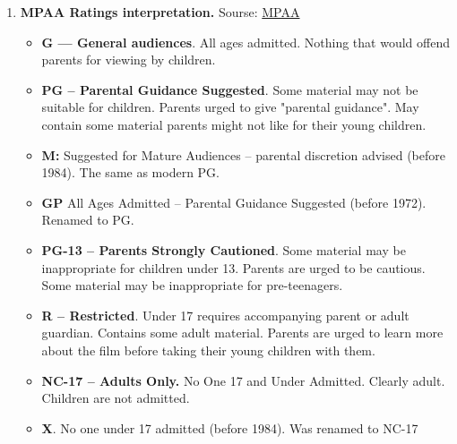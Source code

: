 \documentclass[a4paper,14pt]{article}
\begin{document}
\begin{enumerate}
\item \textbf{MPAA Ratings interpretation. }\label{MPAA}
Sourse: \href{https://en.wikipedia.org/wiki/Motion_Picture_Association_of_America_film_rating_system#From_M_to_GP_to_PG}{MPAA}
\begin{itemize}
\item \textbf{G — General audiences}. All ages admitted. Nothing that would offend parents for viewing by children.
\item \textbf{PG – Parental Guidance Suggested}. Some material may not be suitable for children. Parents urged to give "parental guidance". May contain some material parents might not like for their young children.
\item \textbf{M:} Suggested for Mature Audiences – parental discretion advised (before 1984). The same as modern PG. 
\item \textbf{GP} All Ages Admitted – Parental Guidance Suggested (before 1972). Renamed to PG.
\item \textbf{PG-13 – Parents Strongly Cautioned}. Some material may be inappropriate for children under 13. Parents are urged to be cautious. Some material may be inappropriate for pre-teenagers.
\item \textbf{R – Restricted}. Under 17 requires accompanying parent or adult guardian. Contains some adult material. Parents are urged to learn more about the film before taking their young children with them.
\item \textbf{NC-17 – Adults Only. }No One 17 and Under Admitted. Clearly adult. Children are not admitted.
\item \textbf{X}. No one under 17 admitted (before 1984). Was renamed to NC-17
\end{itemize}

\end{enumerate}
\end{document}
